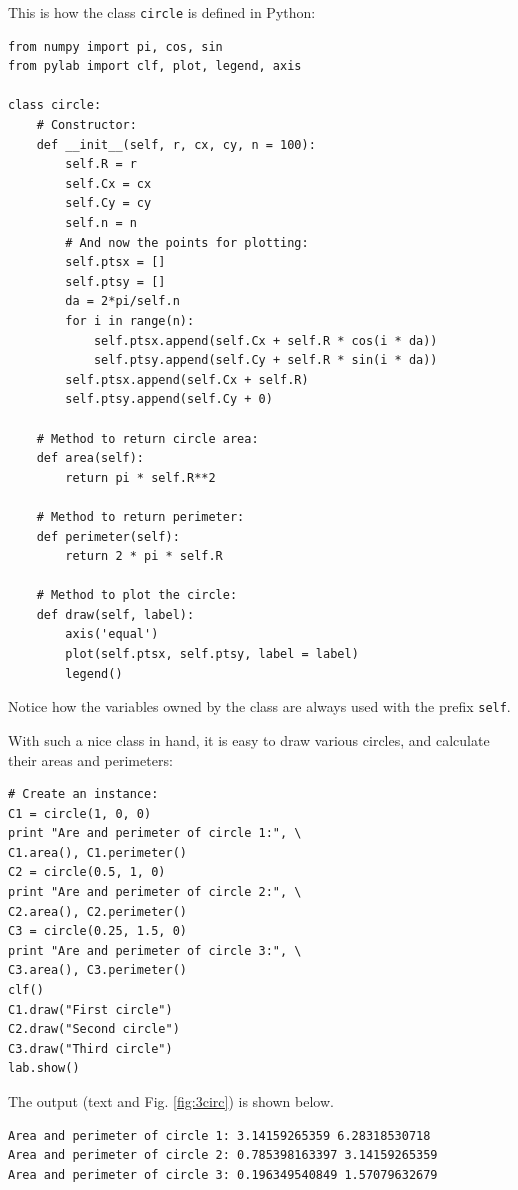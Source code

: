 This is how the class {\tt circle} is defined in Python:

\begin{verbatim}
from numpy import pi, cos, sin
from pylab import clf, plot, legend, axis

class circle:
    # Constructor:
    def __init__(self, r, cx, cy, n = 100):
        self.R = r
        self.Cx = cx
        self.Cy = cy
        self.n = n
        # And now the points for plotting:
        self.ptsx = []
        self.ptsy = []
        da = 2*pi/self.n
        for i in range(n):
            self.ptsx.append(self.Cx + self.R * cos(i * da))
            self.ptsy.append(self.Cy + self.R * sin(i * da))
        self.ptsx.append(self.Cx + self.R)
        self.ptsy.append(self.Cy + 0)
            
    # Method to return circle area:
    def area(self):
        return pi * self.R**2
      
    # Method to return perimeter:
    def perimeter(self):
        return 2 * pi * self.R
      
    # Method to plot the circle:
    def draw(self, label):
        axis('equal')
        plot(self.ptsx, self.ptsy, label = label)
        legend()
\end{verbatim}
Notice how the variables owned by the class are always used with the 
prefix {\tt self}.

With such a nice class in hand, it is easy to draw various circles,
and calculate their areas and perimeters:
\begin{verbatim}        
# Create an instance:
C1 = circle(1, 0, 0)
print "Are and perimeter of circle 1:", \
C1.area(), C1.perimeter()
C2 = circle(0.5, 1, 0)
print "Are and perimeter of circle 2:", \
C2.area(), C2.perimeter()
C3 = circle(0.25, 1.5, 0)
print "Are and perimeter of circle 3:", \
C3.area(), C3.perimeter()
clf()
C1.draw("First circle")
C2.draw("Second circle")
C3.draw("Third circle")
lab.show()
\end{verbatim}
The output (text and Fig. \ref{fig:3circ}) is shown below.

\begin{verbatim}
Area and perimeter of circle 1: 3.14159265359 6.28318530718
Area and perimeter of circle 2: 0.785398163397 3.14159265359
Area and perimeter of circle 3: 0.196349540849 1.57079632679
\end{verbatim}

